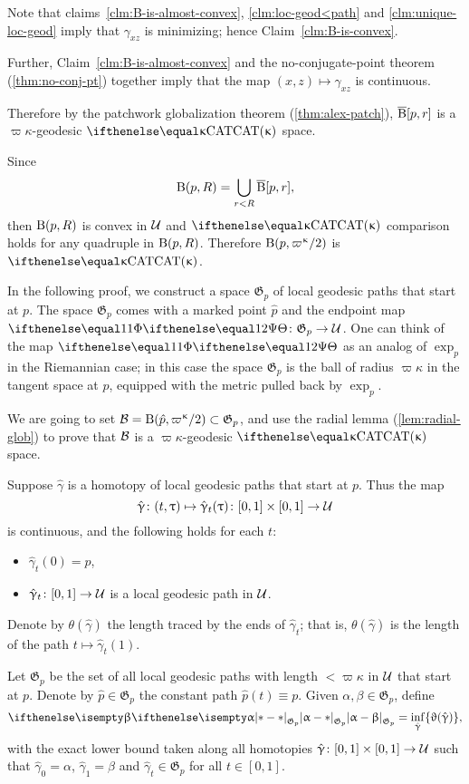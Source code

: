 Note that 
claims~\ref{clm:B-is-almost-convex}, 
\ref{clm:loc-geod<path} 
and \ref{clm:unique-loc-geod}
imply that $\gamma_{x z}$ is minimizing; hence Claim~\ref{clm:B-is-convex}.

Further, Claim~\ref{clm:B-is-almost-convex} and the no-conjugate-point theorem (\ref{thm:no-conj-pt}) together 
imply that the map $(x,z)\mapsto\gamma_{x z}$ is continuous.

Therefore by the patchwork globalization theorem (\ref{thm:alex-patch}), 
$\overline{\mathrm{B}}{}[ p,r]$ is a $\varpi\kappa$-geodesic $\CAT\kappa$ space.

Since
\[\mathrm{B}{}( p,R)
=
\bigcup_{r < R}\overline{\mathrm{B}}{}[ p,r],\] 
then $\mathrm{B}{}( p,R)$ is convex in $\mathcal{U}$ and 
$\CAT\kappa$ comparison holds  for any quadruple in $\mathrm{B}{}( p,R)$.
Therefore $\oBall( p,\varpi\kappa/2)$ is $\CAT\kappa$.
\qeds


In the following proof, we construct a space $\mathfrak{G}_p$ of  local geodesic paths that start at $p$.
The space $\mathfrak{G}_p$ comes with 
a marked point $\hat p$ 
and the endpoint map $\map\:\mathfrak{G}_p\to\spc{U}$.
One can think of
the map $\map$ as an analog of $\exp_p$ in the Riemannian case; in this case
the space $\mathfrak{G}_p$ is the ball of radius $\varpi\kappa$ in the tangent space at $p$, equipped with the metric pulled back by $\exp_p$.

We are going to set $\spc{B}=\oBall(\hat p,\varpi\kappa/2)\subset \mathfrak{G}_p$,
and use the radial lemma (\ref{lem:radial-glob}) to prove that $\mathcal{B}$ is a $\varpi\kappa$-geodesic $\CAT\kappa$ space.

Suppose $\hat\gamma$ is a homotopy of local geodesic paths that start at $p$.  Thus the map 
\[\hat\gamma\:(t,\tau)\mapsto\hat\gamma_t(\tau)\:[0,1]\times[0,1]\to\spc{U}\] 
is continuous,
and the following holds for each $t$:
\begin{itemize}
\item $\hat\gamma_t(0)=p$,
\item $\hat\gamma_t\:[0,1]\to\spc{U}$ is a local geodesic path in $\mathcal{U}$.
\end{itemize}

Denote by $\theta(\hat\gamma)$ the length traced by the ends of $\hat\gamma_t$;
that is, $\theta(\hat\gamma)$ is the length of the path $t\mapsto\hat\gamma_t(1)$.

Let $\mathfrak{G}_p$ be the set of all local geodesic paths 
with length $<\varpi\kappa$ in $\mathcal{U}$ that start at $p$.
Denote by $\hat p\in \mathfrak{G}_p$ the constant path $\hat p(t)\equiv p$.
Given $\alpha,\beta\in \mathfrak{G}_p$, define
\[
\dist{\alpha}{\beta}{\mathfrak{G}_p}
=
\inf_{\hat\gamma} \{\theta(\hat\gamma)\},\]
with the exact lower bound taken along all homotopies 
$\hat\gamma\:[0,1]\times[0,1]\to\spc{U}$ 
such that 
$\hat\gamma_0=\alpha$, 
$\hat\gamma_1=\beta$ 
and $\hat\gamma_t\in \mathfrak{G}_p$ for all $t\in[0,1]$.

